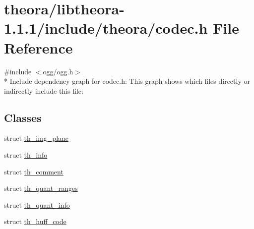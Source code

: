 \hypertarget{theora_2libtheora-1_81_81_2include_2theora_2codec_8h}{\section{theora/libtheora-\/1.1.1/include/theora/codec.h File Reference}
\label{theora_2libtheora-1_81_81_2include_2theora_2codec_8h}
}
{\ttfamily \#include $<$ogg/ogg.\+h$>$}\\*
Include dependency graph for codec.\+h\+:
This graph shows which files directly or indirectly include this file\+:
\subsection*{Classes}
\begin{DoxyCompactItemize}
\item 
struct \hyperlink{structth__img__plane}{th\+\_\+img\+\_\+plane}
\item 
struct \hyperlink{structth__info}{th\+\_\+info}
\item 
struct \hyperlink{structth__comment}{th\+\_\+comment}
\item 
struct \hyperlink{structth__quant__ranges}{th\+\_\+quant\+\_\+ranges}
\item 
struct \hyperlink{structth__quant__info}{th\+\_\+quant\+\_\+info}
\item 
struct \hyperlink{structth__huff__code}{th\+\_\+huff\+\_\+code}
\end{DoxyCompactItemize}
